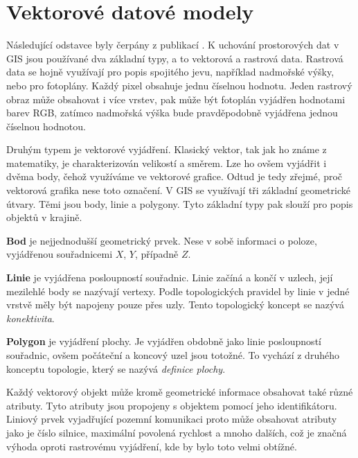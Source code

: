 \chapter{Vektorové datové modely}
\label{chap:vektorovedatovemodely}
	Následující odstavce byly čerpány z publikací \cite{kolar2003geograficke,tucek1997geograficke,vesely2007thesis}. K uchování prostorových dat v GIS jsou používané dva základní typy, a to vektorová a rastrová data. Rastrová data se hojně využívají pro popis spojitého jevu, například nadmořské výšky, nebo pro fotoplány. Každý pixel obsahuje jednu číselnou hodnotu. Jeden rastrový obraz může obsahovat i více vrstev, pak může být fotoplán vyjádřen hodnotami barev RGB, zatímco nadmořská výška bude pravděpodobně vyjádřena jednou číselnou hodnotou.
	
	Druhým typem je vektorové vyjádření. Klasický vektor, tak jak ho známe z matematiky, je charakterizován velikostí a směrem. Lze ho ovšem vyjádřit i dvěma body, čehož využíváme ve vektorové grafice. Odtud je tedy zřejmé, proč vektorová grafika nese toto označení. V GIS se využívají tři základní geometrické útvary. Těmi jsou body, linie a polygony. Tyto základní typy pak slouží pro popis objektů v krajině.
	
	\textbf{Bod} je nejjednodušší geometrický prvek. Nese v sobě informaci o poloze, vyjádřenou souřadnicemi $X$, $Y$, případně $Z$.
	
	\textbf{Linie} je vyjádřena posloupností souřadnic. Linie začíná a končí v uzlech, její mezilehlé body se nazývají vertexy. Podle topologických pravidel by linie v jedné vrstvě měly být napojeny pouze přes uzly. Tento topologický koncept se nazývá \textit{konektivita}.
	
	\textbf{Polygon} je vyjádření plochy. Je vyjádřen obdobně jako linie posloupností souřadnic, ovšem počáteční a koncový uzel jsou totožné. To vychází z druhého konceptu topologie, který se nazývá \textit{definice plochy}.
	
	Každý vektorový objekt může kromě geometrické informace obsahovat také různé atributy. Tyto atributy jsou propojeny s objektem pomocí jeho identifikátoru. Li\-ni\-o\-vý prvek vyjadřující pozemní komunikaci proto může obsahovat atributy jako je číslo silnice, maximální povolená rychlost a mnoho dalších, což je značná výhoda oproti rastrovému vyjádření, kde by bylo toto velmi obtížné.
	
